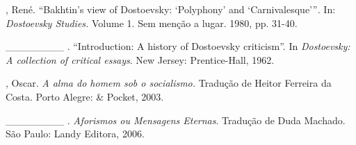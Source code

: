 \begin{Parskip}
, René. ``Bakhtin's view of Dostoevsky: `Polyphony' and
`Carnivalesque'''\emph{.} In: \emph{Dostoevsky Studies.} Volume 1. Sem
menção a lugar. 1980, pp. 31-40.

\_\_\_\_\_\_\_\_ . ``Introduction: A history of Dostoevsky criticism''.
In \emph{Dostoevsky: A collection of critical essays}. New Jersey:
Prentice-Hall, 1962.

, Oscar. \emph{A alma do homem sob o socialismo.} Tradução de
Heitor Ferreira da Costa. Porto Alegre: \& Pocket, 2003.

\_\_\_\_\_\_\_\_ . \emph{Aforismos ou Mensagens Eternas}. Tradução de
Duda Machado. São Paulo: Landy Editora, 2006.

\end{Parskip}

